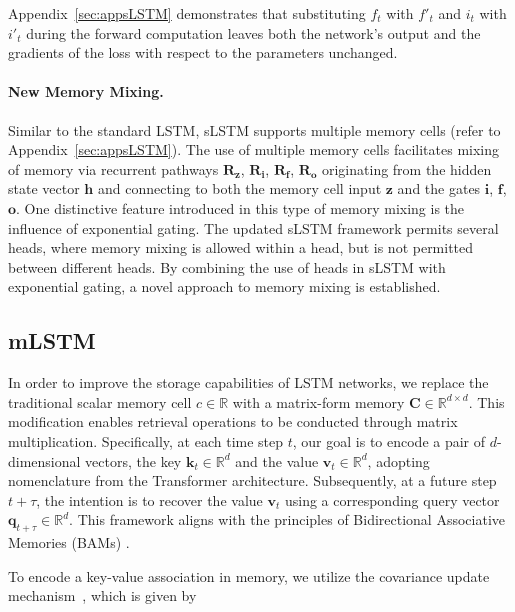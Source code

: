 Appendix~\ref{sec:appsLSTM} demonstrates that substituting $f_t$ with $f'_t$ and $i_t$ with $i'_t$ during the forward computation leaves both the network’s output and the gradients of the loss with respect to the parameters unchanged.

\paragraph{New Memory Mixing.} Similar to the standard LSTM, sLSTM supports multiple memory cells (refer to Appendix~\ref{sec:appsLSTM}). The use of multiple memory cells facilitates mixing of memory via recurrent pathways $\mathbf{R}_{\mathbf{z}}$, $\mathbf{R}_{\mathbf{i}}$, $\mathbf{R}_{\mathbf{f}}$, $\mathbf{R}_{\mathbf{o}}$ originating from the hidden state vector $\mathbf{h}$ and connecting to both the memory cell input $\mathbf{z}$ and the gates $\mathbf{i}$, $\mathbf{f}$, $\mathbf{o}$. One distinctive feature introduced in this type of memory mixing is the influence of exponential gating. The updated sLSTM framework permits several heads, where memory mixing is allowed within a head, but is not permitted between different heads. By combining the use of heads in sLSTM with exponential gating, a novel approach to memory mixing is established.

\subsection{mLSTM}
\label{sec:mLSTM}

In order to improve the storage capabilities of LSTM networks, we replace the traditional scalar memory cell $c \in \mathbb{R}$ with a matrix-form memory $\mathbf{C} \in \mathbb{R}^{d \times d}$. This modification enables retrieval operations to be conducted through matrix multiplication. Specifically, at each time step $t$, our goal is to encode a pair of $d$-dimensional vectors, the key $\mathbf{k}_t \in \mathbb{R}^d$ and the value $\mathbf{v}_t \in \mathbb{R}^d$, adopting nomenclature from the Transformer architecture. Subsequently, at a future step $t + \tau$, the intention is to recover the value $\mathbf{v}_t$ using a corresponding query vector $\mathbf{q}_{t+\tau} \in \mathbb{R}^d$. This framework aligns with the principles of Bidirectional Associative Memories (BAMs) \citep{Kohonen:72,Anderson:72,Nakano:72,Anderson:77}.

To encode a key-value association in memory, we utilize the covariance update mechanism~\citep{Sejnowski:77,Dayan:91}, which is given by

